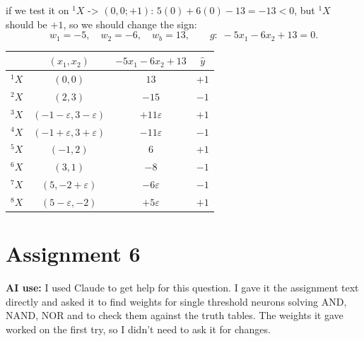 \documentclass[11pt,a4paper]{article}
\begin{document}
if we test it on $^1X$ -> $(0,0;+1)$: $5(0)+6(0)-13=-13<0$, but $^1X$ should be $+1$, so we should change the
sign:
\[
  w_1=-5,\quad w_2=-6,\quad w_b=13, \qquad g:\; -5x_1-6x_2+13=0.
\]

\begin{center}
\begin{tabular}{c|c|c|c}
  & $(x_1,x_2)$ & $-5x_1-6x_2+13$ & $\hat y$ \\\hline
 $^1X$ & $(0,0)$ & $13$ & $+1$ \\
 $^2X$ & $(2,3)$ & $-15$ & $-1$ \\
 $^3X$ & $(-1-\varepsilon,3-\varepsilon)$ & $+11\varepsilon$ & $+1$ \\
 $^4X$ & $(-1+\varepsilon,3+\varepsilon)$ & $-11\varepsilon$ & $-1$ \\
 $^5X$ & $(-1,2)$ & $6$ & $+1$ \\
 $^6X$ & $(3,1)$ & $-8$ & $-1$ \\
 $^7X$ & $(5,-2+\varepsilon)$ & $-6\varepsilon$ & $-1$ \\
 $^8X$ & $(5-\varepsilon,-2)$ & $+5\varepsilon$ & $+1$ \\
\end{tabular}
\end{center}

\begin{center}
\end{center}

\section*{Assignment 6}

\textbf{AI use:} I used Claude to get help for this question. I gave it the assignment text directly and asked it to find
weights for single threshold neurons solving AND, NAND, NOR and to check
them against the truth tables. The weights it gave worked on the first try, so I didn't need to ask it for changes.
\end{document}
